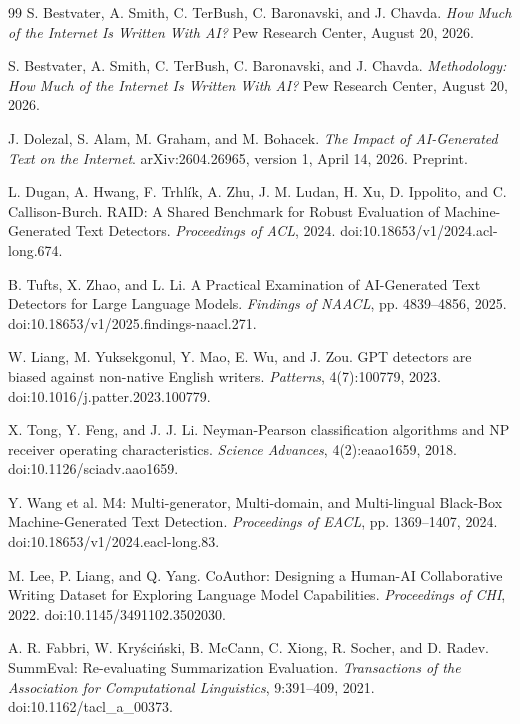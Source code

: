 \documentclass[11pt]{article}
\begin{document}
\begin{thebibliography}{99}
S. Bestvater, A. Smith, C. TerBush, C. Baronavski, and J. Chavda.
\emph{How Much of the Internet Is Written With AI?}
Pew Research Center, August 20, 2026.

S. Bestvater, A. Smith, C. TerBush, C. Baronavski, and J. Chavda.
\emph{Methodology: How Much of the Internet Is Written With AI?}
Pew Research Center, August 20, 2026.

J. Dolezal, S. Alam, M. Graham, and M. Bohacek.
\emph{The Impact of AI-Generated Text on the Internet}.
arXiv:2604.26965, version 1, April 14, 2026. Preprint.

L. Dugan, A. Hwang, F. Trhl\'{i}k, A. Zhu, J. M. Ludan, H. Xu,
D. Ippolito, and C. Callison-Burch.
RAID: A Shared Benchmark for Robust Evaluation of Machine-Generated Text
Detectors. \emph{Proceedings of ACL}, 2024.
doi:10.18653/v1/2024.acl-long.674.

B. Tufts, X. Zhao, and L. Li.
A Practical Examination of AI-Generated Text Detectors for Large Language
Models. \emph{Findings of NAACL}, pp. 4839--4856, 2025.
doi:10.18653/v1/2025.findings-naacl.271.

W. Liang, M. Yuksekgonul, Y. Mao, E. Wu, and J. Zou.
GPT detectors are biased against non-native English writers.
\emph{Patterns}, 4(7):100779, 2023.
doi:10.1016/j.patter.2023.100779.

X. Tong, Y. Feng, and J. J. Li.
Neyman-Pearson classification algorithms and NP receiver operating characteristics.
\emph{Science Advances}, 4(2):eaao1659, 2018.
doi:10.1126/sciadv.aao1659.

Y. Wang et al.
M4: Multi-generator, Multi-domain, and Multi-lingual Black-Box Machine-Generated
Text Detection. \emph{Proceedings of EACL}, pp. 1369--1407, 2024.
doi:10.18653/v1/2024.eacl-long.83.

M. Lee, P. Liang, and Q. Yang.
CoAuthor: Designing a Human-AI Collaborative Writing Dataset for Exploring
Language Model Capabilities. \emph{Proceedings of CHI}, 2022.
doi:10.1145/3491102.3502030.

A. R. Fabbri, W. Kry\'{s}ci\'{n}ski, B. McCann, C. Xiong, R. Socher, and D. Radev.
SummEval: Re-evaluating Summarization Evaluation.
\emph{Transactions of the Association for Computational Linguistics}, 9:391--409,
2021. doi:10.1162/tacl\_a\_00373.
\end{thebibliography}
\end{document}
